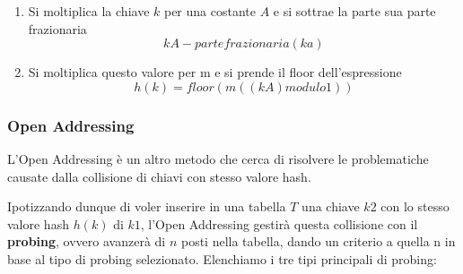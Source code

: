 \documentclass{article}
\begin{document}
\begin{enumerate}
    \item Si moltiplica la chiave $k$ per una costante $A$ e si sottrae la parte sua parte frazionaria
    \begin{equation}
        kA - partefrazionaria(ka)
    \end{equation}
    \item Si moltiplica questo valore per m e si prende il floor dell'espressione
    \begin{equation}
        h(k)=floor(m((kA)modulo1))
    \end{equation}
\end{enumerate}

\newpage

\subsubsection{Open Addressing} L'Open Addressing è un altro metodo che cerca di risolvere le problematiche causate dalla collisione di chiavi con stesso valore hash.

Ipotizzando dunque di voler inserire in una tabella $T$ una chiave $k2$ con lo stesso valore hash $h(k)$ di $k1$, l'Open Addressing gestirà questa collisione con il \textbf{probing}, ovvero avanzerà di $n$ posti nella tabella, dando un criterio a quella n in base al tipo di probing selezionato. Elenchiamo i tre tipi principali di probing:
\end{document}
